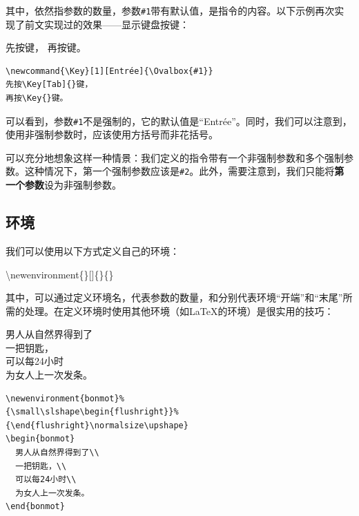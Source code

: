 其中，依然指参数的数量，参数\verb|#1|带有默认值，是指令的内容。以下示例再次实现了前文实现过的效果——显示键盘按键：

\begin{codelist}[4.22]{
  \newcommand{\Key}[1][Entrée]{\Ovalbox{#1}} 
  先按\Key[Tab]{}键，
  再按\Key{}键。
}\begin{verbatim}
\newcommand{\Key}[1][Entrée]{\Ovalbox{#1}} 
先按\Key[Tab]{}键，
再按\Key{}键。
\end{verbatim}
\end{codelist}

可以看到，参数\verb|#1|不是强制的，它的默认值是“Entrée”。同时，我们可以注意到，使用非强制参数时，应该使用方括号而非花括号。

\begin{exclamation}
可以充分地想象这样一种情景：我们定义的指令带有一个非强制参数和多个强制参数。这种情况下，第一个强制参数应该是\verb|#2|。此外，需要注意到，我们只能将\textbf{第一个参数}设为非强制参数。
\end{exclamation}

\subsection{环境}

我们可以使用以下方式定义自己的环境：

\begin{dmd}
\backslash newenvironment\{\}[]\{\}\{\}
\end{dmd}

其中，可以通过定义环境名，代表参数的数量，和分别代表环境“开端”和“末尾”所需的处理。在定义环境时使用其他环境（如\LaTeX 的环境）是很实用的技巧：

\begin{codelist}[4.23]{
  \newenvironment{bonmot}%
{\small\slshape\begin{flushright}}%
{\end{flushright}\normalsize\upshape}
\begin{bonmot}
  男人从自然界得到了\\
  一把钥匙，\\
  可以每24小时\\
  为女人上一次发条。
\end{bonmot}
}\begin{verbatim}
\newenvironment{bonmot}%
{\small\slshape\begin{flushright}}%
{\end{flushright}\normalsize\upshape}
\begin{bonmot}
  男人从自然界得到了\\
  一把钥匙，\\
  可以每24小时\\
  为女人上一次发条。
\end{bonmot}
\end{verbatim}
\end{codelist}

